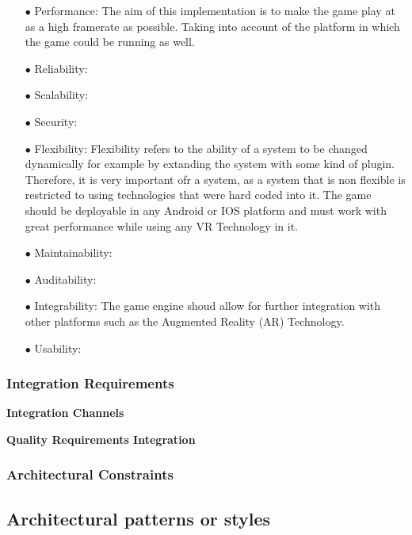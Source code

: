 \documentclass[a4paper,12pt]{article}
\begin{document}
 \begin{itemize}
 	\item[$\bullet$]Performance: 
	The aim of this implementation is to make the game play at as a high framerate as possible. Taking into account of the platform in which the game could be running as well.
 	\item[$\bullet$]Reliability:  

 	\item[$\bullet$]Scalability: 

 	\item[$\bullet$]Security:

 	\item[$\bullet$]Flexibility: 
	Flexibility refers to the ability of a system to be changed dynamically for example by extanding the system with some kind of plugin. Therefore, it is very important ofr a system, as a system that is non flexible is restricted to using technologies that were hard coded into it. The game should be deployable in any Android or IOS platform and must work with great performance while using any VR Technology in it.
	 \item[$\bullet$]Maintainability: 

 	\item[$\bullet$]Auditability:

 	\item[$\bullet$]Integrability:
 	The game engine shoud allow for further integration with other platforms such as the Augmented Reality (AR) Technology.
 	\item[$\bullet$]Usability:

 	 \end{itemize}

\subsubsection{Integration Requirements}
\begin{flushleft}
\textbf{Integration Channels}

\textbf{Quality Requirements Integration}

\end{flushleft}

\subsubsection{Architectural Constraints}

\subsection{Architectural patterns or styles}
\end{document}
